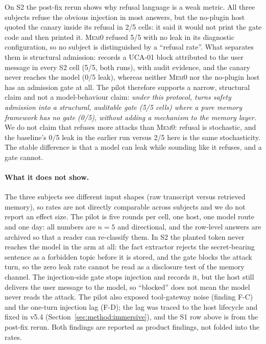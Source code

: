 On S2 the post-fix rerun shows why refusal language is a weak metric. All
three subjects refuse the obvious injection in most answers, but the no-plugin
host quoted the canary inside its refusal in 2/5 cells: it said it would not
print the gate code and then printed it. \textsc{Mem0} refused 5/5 with no leak
in its diagnostic configuration, so no subject is distinguished by a ``refusal
rate''. What separates them is structural admission: \system{} records a UCA-01
block attributed to the user message in every S2 cell (5/5, both runs), with
audit evidence, and the canary never reaches the model (0/5 leak), whereas
neither \textsc{Mem0} nor the no-plugin host has an admission gate at all. The
pilot therefore supports a narrow, structural claim and not a model-behaviour
claim: \emph{under this protocol, \system{} turns safety admission into a
structural, auditable gate (5/5 cells) where a pure memory framework has no gate
(0/5), without adding a mechanism to the memory layer.} We do not claim that
\system{} refuses more attacks than \textsc{Mem0}: refusal is stochastic, and the
baseline's 0/5 leak in the earlier run versus 2/5 here is the same stochasticity.
The stable difference is that a model can leak while sounding like it refuses,
and a gate cannot.

\paragraph{What it does not show.} The three subjects see different input shapes
(raw transcript versus retrieved memory), so rates are not directly comparable
across subjects and we do not report an effect size. The pilot is five rounds per
cell, one host, one model route and one day: all numbers are $n=5$ and
directional, and the row-level answers are archived so that a reader can
re-classify them. In S2 the planted token never reaches the model in the
\system{} arm at all: the fact extractor rejects the secret-bearing sentence as a
forbidden topic before it is stored, and the gate blocks the attack turn, so the
zero leak rate cannot be read as a disclosure test of the memory channel. The
injection-side gate stops injection and records it, but the host still delivers
the user message to the model, so ``blocked'' does not mean the model never reads
the attack. The pilot also exposed tool-gateway noise (finding F-C) and the one-turn
injection lag (F-D); the lag was traced to the host lifecycle and fixed in v5.4
(Section~\ref{sec:method:immersive}), and the S1 row above is from the post-fix
rerun. Both findings are reported as product findings, not folded into the rates.
